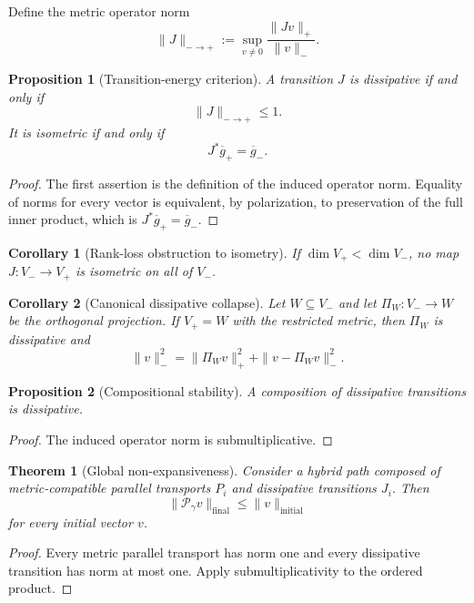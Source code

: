 \documentclass[11pt]{article}
\newtheorem{theorem}{Theorem}[section]
\newtheorem{proposition}{Proposition}[section]
\newtheorem{corollary}{Corollary}[section]
\begin{document}
Define the metric operator norm
\[
\|J\|_{-\to+}:=
\sup_{v\ne0}\frac{\|Jv\|_+}{\|v\|_-}.
\]

\begin{proposition}[Transition-energy criterion]
A transition $J$ is dissipative if and only if
\[
\|J\|_{-\to+}\le1.
\]
It is isometric if and only if
\[
J^*\overline g_+=\overline g_-.
\]
\end{proposition}

\begin{proof}
The first assertion is the definition of the induced operator norm. Equality
of norms for every vector is equivalent, by polarization, to preservation of
the full inner product, which is $J^*\overline g_+=\overline g_-$.
\end{proof}

\begin{corollary}[Rank-loss obstruction to isometry]
If $\dim V_+<\dim V_-$, no map $J:V_-\to V_+$ is isometric on all of $V_-$.
\end{corollary}

\begin{corollary}[Canonical dissipative collapse]
Let $W\subseteq V_-$ and let $\Pi_W:V_-\to W$ be the orthogonal projection.
If $V_+=W$ with the restricted metric, then $\Pi_W$ is dissipative and
\[
\|v\|_-^2=\|\Pi_Wv\|_+^2+\|v-\Pi_Wv\|_-^2.
\]
\end{corollary}

\begin{proposition}[Compositional stability]
A composition of dissipative transitions is dissipative.
\end{proposition}

\begin{proof}
The induced operator norm is submultiplicative.
\end{proof}

\begin{theorem}[Global non-expansiveness]
Consider a hybrid path composed of metric-compatible parallel transports
$P_i$ and dissipative transitions $J_i$. Then
\[
\|\mathcal P_\gamma v\|_{\mathrm{final}}
\le\|v\|_{\mathrm{initial}}
\]
for every initial vector $v$.
\end{theorem}

\begin{proof}
Every metric parallel transport has norm one and every dissipative transition
has norm at most one. Apply submultiplicativity to the ordered product.
\end{proof}
\end{document}
